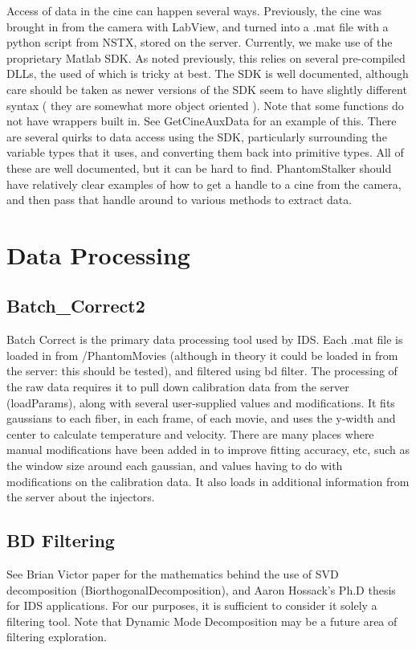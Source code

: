 \documentclass[twoside]{article}
\begin{document}
\hspace*{4ex}Access of data in the cine can happen several ways. Previously, the cine was brought in from the camera with LabView, and turned into a .mat file with a python script from NSTX, stored on the server. Currently, we make use of the proprietary Matlab SDK. As noted previously, this relies on several pre-compiled DLLs, the used of which is tricky at best. The SDK is well documented, although care should be taken as newer versions of the SDK seem to have slightly different syntax ( they are somewhat more object oriented ). Note that some functions do not have wrappers built in. See GetCineAuxData for an example of this. There are several quirks to data access using the SDK, particularly surrounding the variable types that it uses, and converting them back into primitive types. All of these are well documented, but it can be hard to find. PhantomStalker should have relatively clear examples of how to get a handle to a cine from the camera, and then pass that handle around to various methods to extract data. 


\section{Data Processing}
\subsection{Batch\_Correct2}
\hspace{4ex}Batch Correct is the primary data processing tool used by IDS. Each .mat file is loaded in from /PhantomMovies (although in theory it could be loaded in from the server: this should be tested), and filtered using bd filter.  The processing of the raw data requires it to pull down calibration data from the server (loadParams), along with several user-supplied values and modifications. It fits gaussians to each fiber, in each frame, of each movie, and uses the y-width and center to calculate temperature and velocity. There are many places where manual modifications have been added in to improve fitting accuracy, etc, such as the window size around each gaussian, and values having to do with modifications on the calibration data. It also loads in additional information from the server about the injectors.
\subsection{BD Filtering}
\hspace{4ex}See Brian Victor paper for the mathematics behind the use of SVD decomposition (Biorthogonal\-Decomposition), and Aaron Hossack’s Ph.D thesis for IDS applications. For our purposes, it is sufficient to consider it solely a filtering tool. Note that Dynamic Mode Decomposition may be a future area of filtering exploration.
\end{document}

